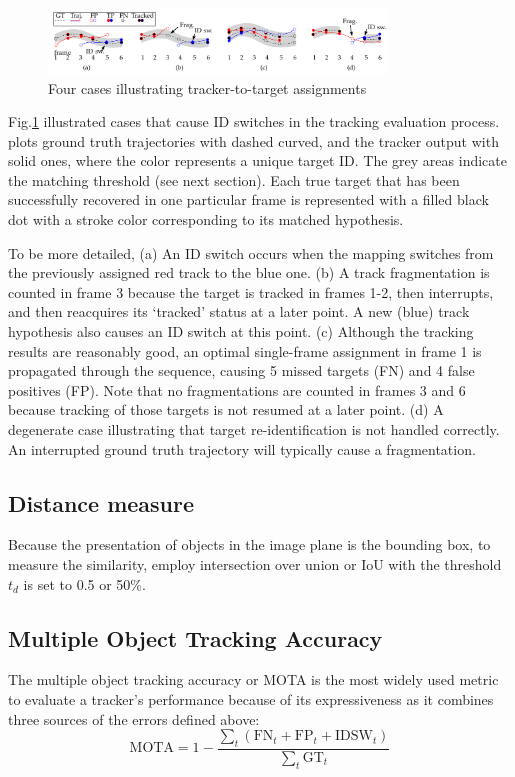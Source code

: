 \begin{figure}[h!]
    \centering
    \includegraphics[width=0.8\textwidth]{Chapters/Fig/id_switch_mot.png}
    \caption{Four cases illustrating tracker-to-target assignments}
    \label{fig:ids_mot}
\end{figure}
Fig.\ref{fig:ids_mot} illustrated cases that cause ID switches in the tracking evaluation process. \cite{Milan2016MOT16AB} plots ground truth trajectories with dashed curved, and the tracker output with solid ones, where the color represents a unique target ID. The grey areas indicate the matching threshold (see next section). Each
true target that has been successfully recovered in one particular frame is represented with a filled black dot with a stroke color corresponding to its matched hypothesis.\par 
To be more detailed, (a) An ID switch occurs when the mapping switches from the previously assigned red track to the blue one. (b) A track fragmentation is counted in frame 3 because the target is tracked in frames 1-2, then interrupts, and then reacquires its ‘tracked’ status at a later point. A new (blue) track hypothesis also causes an ID switch at this point. (c) Although the tracking results are reasonably good, an optimal single-frame assignment in frame 1 is propagated through the sequence, causing 5 missed targets (FN) and 4 false positives (FP). Note that no fragmentations are counted in frames 3 and 6 because tracking of those targets is not resumed at a later point. (d) A degenerate case illustrating that target re-identification is not handled correctly. An interrupted ground truth trajectory will typically cause a fragmentation.
\subsection{Distance measure}
Because the presentation of objects in the image plane is the bounding box, to measure the similarity, \cite{Milan2016MOT16AB} employ intersection over union or IoU with the threshold $t_d$ is set to 0.5 or 50\%.
\subsection{Multiple Object Tracking Accuracy}
The multiple object tracking accuracy or MOTA is the most widely used metric to evaluate a tracker's performance because of its expressiveness as it combines three sources of the errors defined above:
\begin{equation}
    \text{MOTA} = 1 - \frac{\sum_t(\text{FN}_t + \text{FP}_t + \text{IDSW}_t)}{\sum_t\text{GT}_t}
\end{equation}
